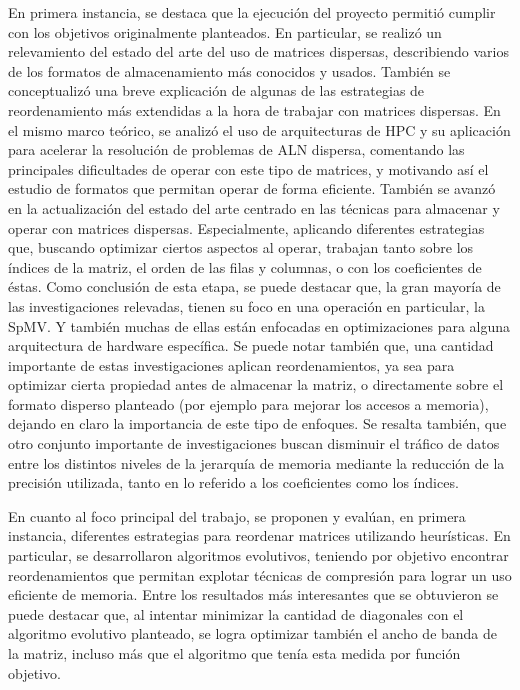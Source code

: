 En primera instancia, se destaca que la ejecución del proyecto permitió cumplir con los objetivos originalmente planteados. En particular, se realizó un relevamiento del estado del arte del uso de matrices dispersas, describiendo varios de los formatos de almacenamiento más conocidos y usados. También se conceptualizó una breve explicación de algunas de las estrategias de reordenamiento más extendidas a la hora de trabajar con matrices dispersas. 
En el mismo marco teórico, se analizó el uso de arquitecturas de HPC y su aplicación para acelerar la resolución de problemas de ALN dispersa, comentando las principales dificultades de operar con este tipo de matrices, y motivando así el estudio de formatos que permitan operar de forma eficiente. 
También se avanzó en la actualización del estado del arte centrado en las técnicas para almacenar y operar con matrices dispersas. Especialmente, aplicando diferentes estrategias que, buscando optimizar ciertos aspectos al operar, trabajan tanto sobre los índices de la matriz, el orden de las filas y columnas, o con los coeficientes de éstas. Como conclusión de esta etapa, se puede destacar que, la gran mayoría de las investigaciones relevadas, tienen su foco en una operación en particular, la SpMV. Y también muchas de ellas están enfocadas en optimizaciones para alguna arquitectura de hardware específica. Se puede notar también que, una cantidad importante de estas investigaciones aplican reordenamientos, ya sea para optimizar cierta propiedad antes de almacenar la matriz, o directamente sobre el formato disperso planteado (por ejemplo para mejorar los accesos a memoria), dejando en claro la importancia de este tipo de enfoques. Se resalta también, que otro conjunto importante de investigaciones buscan disminuir el tráfico de datos entre los distintos niveles de la jerarquía de memoria mediante la reducción de la precisión utilizada, tanto en lo referido a los coeficientes como los índices.

En cuanto al foco principal del trabajo, se proponen y evalúan, en primera instancia, diferentes estrategias para reordenar matrices utilizando heurísticas. En particular, se desarrollaron algoritmos evolutivos, teniendo por objetivo encontrar reordenamientos que permitan explotar técnicas de compresión para lograr un uso eficiente de memoria. Entre los resultados más interesantes que se obtuvieron se puede destacar que, al intentar minimizar la cantidad de diagonales con el algoritmo evolutivo planteado, se logra optimizar también el ancho de banda de la matriz, incluso más que el algoritmo que tenía esta medida por función objetivo.

